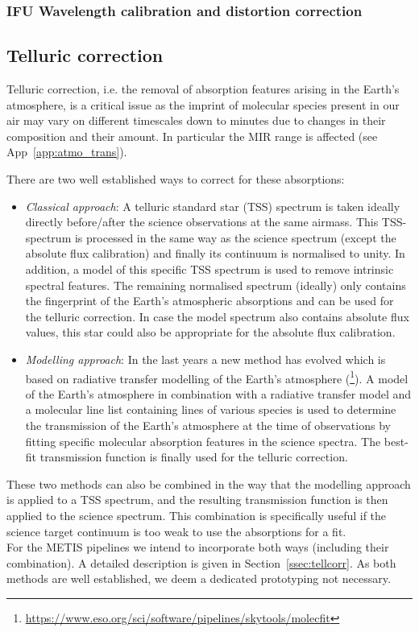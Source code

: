 \subsubsection{IFU Wavelength calibration and distortion correction}\label{ssec:criticalwavelengthanddistortionifu}


\subsection{Telluric correction}\label{ssec:criticaltelluriccorrection}
Telluric correction, i.e. the removal of absorption features arising in the Earth's atmosphere,
is a critical issue as the imprint of molecular species present in our air may vary on different timescales
down to minutes due to changes in their composition and their amount.
In particular the \ac{MIR} range is affected (see App~\ref{app:atmo_trans}).

There are two well established ways to correct for these absorptions:
\begin{itemize}
    \item \textit{Classical approach}: A telluric standard star (\ac{TSS}) spectrum is taken ideally directly before/after the science observations at the same airmass. This \ac{TSS}-spectrum is processed in the same way as the science spectrum (except the absolute flux calibration) and finally its continuum is normalised to unity. In addition, a model of this specific \ac{TSS} spectrum is used to remove intrinsic spectral features. The remaining normalised spectrum (ideally) only contains the fingerprint of the Earth's atmospheric absorptions and can be used for the telluric correction. In case the model spectrum also contains absolute flux values, this star could also be appropriate for the absolute flux calibration.
    \item \textit{Modelling approach}: In the last years a new method has evolved which is based on radiative transfer modelling of the Earth's atmosphere (\cite{mf1, mf2, molecfit}\footnote{\url{https://www.eso.org/sci/software/pipelines/skytools/molecfit}}). A model of the Earth's atmosphere in combination with a radiative transfer model and a molecular line list containing lines of various species is used to determine the transmission of the Earth's atmosphere at the time of observations by fitting specific molecular absorption features in the science spectra. The best-fit transmission function is finally used for the telluric correction.
\end{itemize}
These two methods can also be combined in the way that the modelling approach is applied to a \ac{TSS} spectrum, and the resulting transmission function is then applied to the science spectrum. This combination is specifically useful if the science target continuum is too weak to use the absorptions for a fit.\\
For the \ac{METIS} pipelines we intend to incorporate both ways (including their combination). A detailed description is given in Section~\ref{ssec:tellcorr}. As both methods are well established, we deem a dedicated prototyping not necessary.

